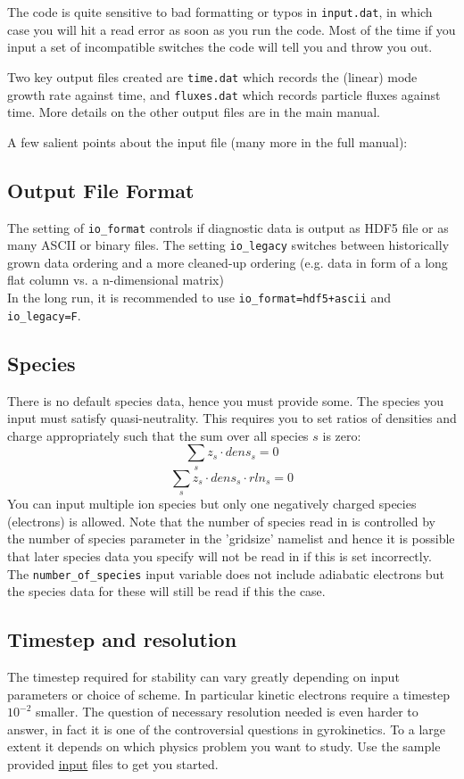 \documentclass[a4paper,10pt]{article}
\newcommand{\doc}[1]{\href{http://bitbucket.org/gkw/gkw/src/HEAD/doc/#1}{#1}}
\begin{document}
The code is quite sensitive to bad formatting or typos in
\texttt{input.dat}, in which case you will hit a read error as soon as
you run the code.  Most of the time if you input a set of incompatible
switches the code will tell you and throw you out.

Two key output files created are \texttt{time.dat} which records the
(linear) mode growth rate against time, and \texttt{fluxes.dat} which
records particle fluxes against time.  More details on the other
output files are in the main manual.

A few salient points about the input file (many more in the full
manual):

\subsection{Output File Format}
The setting of \texttt{io\_format} controls if diagnostic data is
output as HDF5 file or as many ASCII or binary files. The setting
\texttt{io\_legacy} switches between historically grown data ordering
and a more cleaned-up ordering (e.g. data in form of a long flat
column vs. a n-dimensional matrix)\\
In the long run, it is recommended to use
\texttt{io\_format=hdf5+ascii} and \texttt{io\_legacy=F}.

\subsection{Species}
There is no default species data, hence you must provide some. The species you input must satisfy quasi-neutrality. This requires you to set ratios of densities and charge appropriately such that the sum over all species $s$ is zero:
\begin{equation}
 \sum_s z_s \cdot dens_s = 0
\end{equation}
\begin{equation}
 \sum_s z_s \cdot dens_s \cdot rln_s= 0
\end{equation}
You can input multiple ion species but only one negatively charged species (electrons) is allowed.  Note that the number of species read in is controlled by the number of species parameter in the 'gridsize' namelist and hence it is possible that later species data you specify will not be read in if this is set incorrectly.  The \texttt{number\_of\_species} input variable does not include adiabatic electrons but the species data for these will still be read if this the case.

\subsection{Timestep and resolution}
The timestep required for stability can vary greatly depending on input parameters or choice of scheme.  In particular kinetic electrons require a timestep $10^{-2}$ smaller.  The question of necessary resolution needed is even harder to answer, in fact it is one of the controversial questions in gyrokinetics.  To a large extent it depends on which physics problem you want to study.  Use the sample provided \doc{input} files to get you started.
\end{document}
